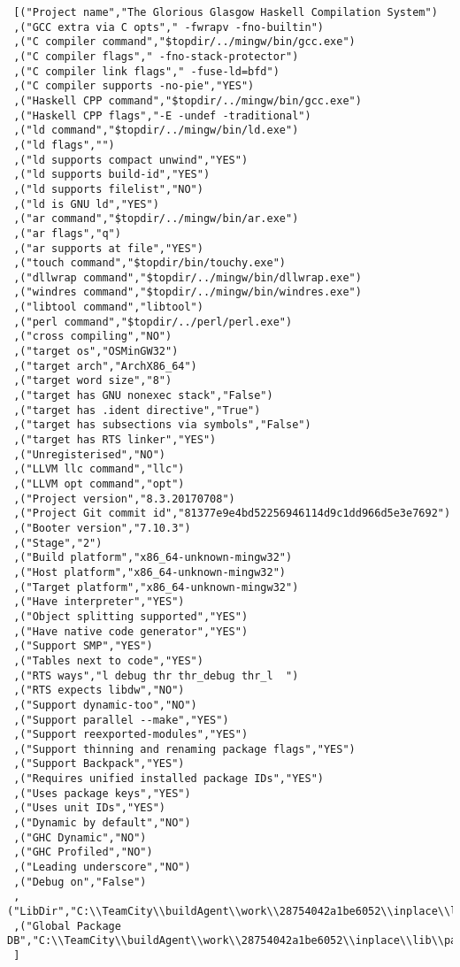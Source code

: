 \begin{verbatim}
 [("Project name","The Glorious Glasgow Haskell Compilation System")
 ,("GCC extra via C opts"," -fwrapv -fno-builtin")
 ,("C compiler command","$topdir/../mingw/bin/gcc.exe")
 ,("C compiler flags"," -fno-stack-protector")
 ,("C compiler link flags"," -fuse-ld=bfd")
 ,("C compiler supports -no-pie","YES")
 ,("Haskell CPP command","$topdir/../mingw/bin/gcc.exe")
 ,("Haskell CPP flags","-E -undef -traditional")
 ,("ld command","$topdir/../mingw/bin/ld.exe")
 ,("ld flags","")
 ,("ld supports compact unwind","YES")
 ,("ld supports build-id","YES")
 ,("ld supports filelist","NO")
 ,("ld is GNU ld","YES")
 ,("ar command","$topdir/../mingw/bin/ar.exe")
 ,("ar flags","q")
 ,("ar supports at file","YES")
 ,("touch command","$topdir/bin/touchy.exe")
 ,("dllwrap command","$topdir/../mingw/bin/dllwrap.exe")
 ,("windres command","$topdir/../mingw/bin/windres.exe")
 ,("libtool command","libtool")
 ,("perl command","$topdir/../perl/perl.exe")
 ,("cross compiling","NO")
 ,("target os","OSMinGW32")
 ,("target arch","ArchX86_64")
 ,("target word size","8")
 ,("target has GNU nonexec stack","False")
 ,("target has .ident directive","True")
 ,("target has subsections via symbols","False")
 ,("target has RTS linker","YES")
 ,("Unregisterised","NO")
 ,("LLVM llc command","llc")
 ,("LLVM opt command","opt")
 ,("Project version","8.3.20170708")
 ,("Project Git commit id","81377e9e4bd52256946114d9c1dd966d5e3e7692")
 ,("Booter version","7.10.3")
 ,("Stage","2")
 ,("Build platform","x86_64-unknown-mingw32")
 ,("Host platform","x86_64-unknown-mingw32")
 ,("Target platform","x86_64-unknown-mingw32")
 ,("Have interpreter","YES")
 ,("Object splitting supported","YES")
 ,("Have native code generator","YES")
 ,("Support SMP","YES")
 ,("Tables next to code","YES")
 ,("RTS ways","l debug thr thr_debug thr_l  ")
 ,("RTS expects libdw","NO")
 ,("Support dynamic-too","NO")
 ,("Support parallel --make","YES")
 ,("Support reexported-modules","YES")
 ,("Support thinning and renaming package flags","YES")
 ,("Support Backpack","YES")
 ,("Requires unified installed package IDs","YES")
 ,("Uses package keys","YES")
 ,("Uses unit IDs","YES")
 ,("Dynamic by default","NO")
 ,("GHC Dynamic","NO")
 ,("GHC Profiled","NO")
 ,("Leading underscore","NO")
 ,("Debug on","False")
 ,("LibDir","C:\\TeamCity\\buildAgent\\work\\28754042a1be6052\\inplace\\lib")
 ,("Global Package DB","C:\\TeamCity\\buildAgent\\work\\28754042a1be6052\\inplace\\lib\\package.conf.d")
 ]
\end{verbatim}
